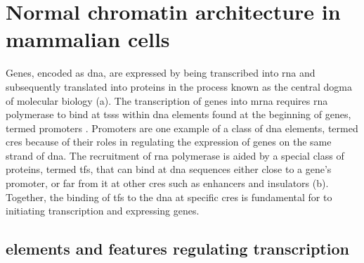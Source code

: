 \section{Normal chromatin architecture in mammalian cells}

Genes, encoded as \gls{dna}, are expressed by being transcribed into \gls{rna} and subsequently translated into proteins in the process known as the central dogma of molecular biology \cite{albertsMolecularBiologyCell2015} (a).
The transcription of genes into \gls{mrna} requires \gls{rna} polymerase to bind at \glspl{tss} within \gls{dna} elements found at the beginning of genes, termed promoters \cite{goodrichUnexpectedRolesCore2010}.
Promoters are one example of a class of \gls{dna} elements, termed \glspl{cre} because of their roles in regulating the expression of genes on the same strand of \gls{dna}.
The recruitment of \gls{rna} polymerase is aided by a special class of proteins, termed \glspl{tf}, that can bind at \gls{dna} sequences either close to a gene's promoter, or far from it at other \glspl{cre} such as enhancers and insulators \cite{schoenfelderLongrangeEnhancerPromoter2019,spitzTranscriptionFactorsEnhancer2012,ongEnhancerFunctionNew2011,anderssonDeterminantsEnhancerPromoter2020,gasznerInsulatorsExploitingTranscriptional2006,oudelaarRelationshipGenomeStructure2020} (b).
Together, the binding of \glspl{tf} to the \gls{dna} at specific \glspl{cre} is fundamental for to initiating transcription and expressing genes.

\subsection{ elements and features regulating transcription}


